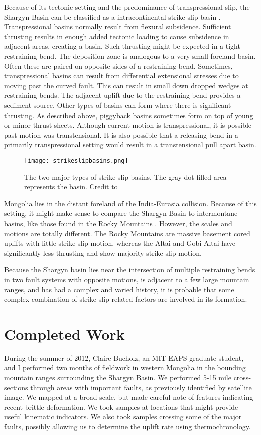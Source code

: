 \documentclass[10pt,a4paper]{article}
\begin{document}
	Because of its tectonic setting and the predominance of transpressional slip, the Shargyn Basin can be classified as a intracontinental strike-slip basin \citep{Busby1995}. Transpressional basins normally result from flexural subsidence. Sufficient thrusting results in enough added tectonic loading to cause subsidence in adjacent areas, creating a basin. Such thrusting might be expected in a tight restraining bend. The deposition zone is analogous to a very small foreland basin. Often these are paired on opposite sides of a restraining bend. Sometimes, transpressional basins can result from differential extensional stresses due to moving past the curved fault. This can result in small down dropped wedges at restraining bends. The adjacent uplift due to the restraining bend provides a sediment source. Other types of basins can form where there is significant thrusting. As described above, piggyback basins sometimes form on top of young or minor thrust sheets. Although current motion is transpressional, it is possible past motion was transtensional. It is also possible that a releasing bend in a primarily transpressional setting would result in a transtensional pull apart basin. 
	
\begin{figure}[h!]
  \centering
  \texttt{[image: strikeslipbasins.png]}
  \caption{The two major types of strike slip basins. The gray dot-filled area represents the basin. Credit to \citep{Busby1995}}
\end{figure}

	Mongolia lies in the distant foreland of the India-Eurasia collision. Because of this setting, it might make sense to compare the Shargyn Basin to intermontane basins, like those found in the Rocky Mountains \citep{Busby1995}. However, the scales and motions are totally different. The Rocky Mountains are massive basement cored uplifts with little strike slip motion, whereas the Altai and Gobi-Altai have significantly less thrusting and show majority strike-slip motion.
	
	Because the Shargyn basin lies near the intersection of multiple restraining bends in two fault systems with opposite motions, is adjacent to a few large mountain ranges, and has had a complex and varied history, it is probable that some complex combination of strike-slip related factors are involved in its formation. 
	
\section*{Completed Work}
	During the summer of 2012, Claire Bucholz, an MIT EAPS graduate student, and I performed two months of fieldwork in western Mongolia in the bounding mountain ranges surrounding the Shargyn Basin. We performed 5-15 mile cross-sections through areas with important faults, as previously identified by satellite image. We mapped at a broad scale, but made careful note of features indicating recent brittle deformation. We took samples at locations that might provide useful kinematic indicators. We also took samples crossing some of the major faults, possibly allowing us to determine the uplift rate using thermochronology. 
\end{document}
